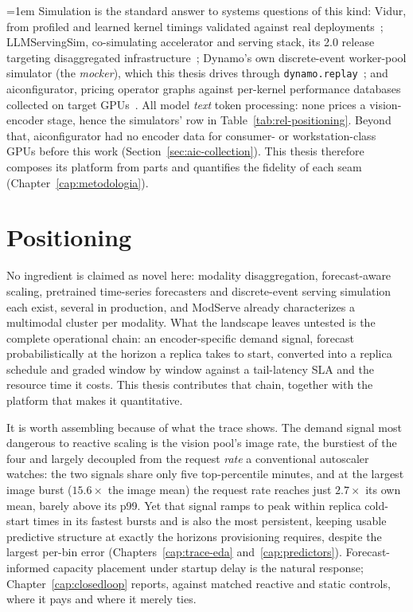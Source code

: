 {\emergencystretch=1em
Simulation is the standard answer to systems questions of this kind:
Vidur, from profiled and learned kernel timings validated against real
deployments~\cite{Agrawal2024Vidur}; LLMServingSim, co-simulating
accelerator and serving stack, its 2.0 release targeting disaggregated
infrastructure~\cite{Cho2024LLMServingSim,Cho2026LLMServingSim2};
Dynamo's own discrete-event worker-pool simulator (the \emph{mocker}),
which this thesis drives through
\texttt{dynamo.replay}~\cite{Dynamo2025}; and aiconfigurator, pricing
operator graphs against per-kernel performance databases collected on
target GPUs~\cite{AIConfigurator2025}. All model \emph{text} token
processing: none prices a vision-encoder stage, hence the
simulators' row in Table~\ref{tab:rel-positioning}. Beyond that,
aiconfigurator had no
encoder data for consumer- or workstation-class GPUs before this work
(Section~\ref{sec:aic-collection}). This thesis therefore composes its
platform from parts and quantifies the fidelity of each seam
(Chapter~\ref{cap:metodologia}).\par}

\section{Positioning}
\label{sec:rel-positioning}

No ingredient is claimed as novel here: modality disaggregation,
forecast-aware scaling, pretrained time-series forecasters and
discrete-event serving simulation each exist, several in production, and
ModServe already characterizes a multimodal cluster per modality. What
the landscape leaves untested is the complete operational chain: an
encoder-specific demand signal, forecast probabilistically at the
horizon a replica takes to start, converted into a replica schedule and
graded window by window against a tail-latency SLA and the resource
time it costs. This thesis contributes that chain, together with the
platform that makes it quantitative.

It is worth assembling because of what the trace shows. The demand
signal most dangerous to reactive scaling is the vision pool's image
rate, the burstiest of the four and largely decoupled from the request
\emph{rate} a conventional autoscaler watches: the two signals share
only five top-percentile minutes, and at the largest image burst
($15.6\times$ the image mean) the request rate reaches just
$2.7\times$ its own mean, barely above its p99. Yet that signal ramps to
peak within replica cold-start times in its fastest bursts and is also the
most persistent, keeping usable predictive structure at exactly the
horizons provisioning requires, despite the largest per-bin error
(Chapters~\ref{cap:trace-eda} and~\ref{cap:predictors}).
Forecast-informed capacity placement under startup delay is the natural
response; Chapter~\ref{cap:closedloop} reports, against
matched reactive and static controls, where it pays and where it merely
ties.


